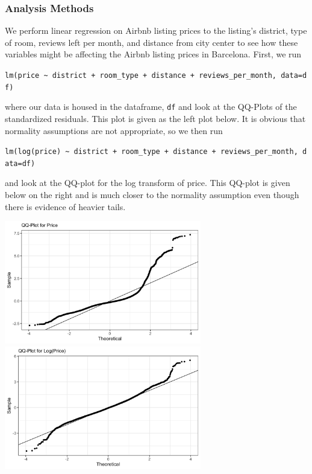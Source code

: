 \documentclass[]{article}
\begin{document}
\hypertarget{analysis-methods}{%
\subsubsection{Analysis Methods}\label{analysis-methods}}

We perform linear regression on Airbnb listing prices to the listing's
district, type of room, reviews left per month, and distance from city
center to see how these variables might be affecting the Airbnb listing
prices in Barcelona. First, we run

\texttt{lm(price\ \textasciitilde{}\ district\ +\ room\_type\ +\ distance\ +\ reviews\_per\_month,\ data=df)}

where our data is housed in the dataframe, \texttt{df} and look at the
QQ-Plots of the standardized residuals. This plot is given as the left
plot below. It is obvious that normality assumptions are not
appropriate, so we then run

\texttt{lm(log(price)\ \textasciitilde{}\ district\ +\ room\_type\ +\ distance\ +\ reviews\_per\_month,\ data=df)}

and look at the QQ-plot for the log transform of price. This QQ-plot is
given below on the right and is much closer to the normality assumption
even though there is evidence of heavier tails.

\includegraphics[width=3.38542in,height=\textheight]{../images/lm1-QQPlot.png}
\includegraphics[width=3.38542in,height=\textheight]{../images/lm2-QQPlot.png}
\end{document}
